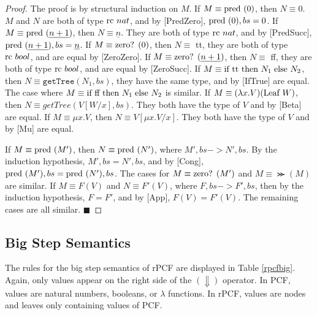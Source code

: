 \begin{proof}
The proof is by structural induction on $M$.  If $M\equiv \textrm{pred } (0)$, then $N \equiv 0$.  $M$ and $N$ are both of type $\textrm{rc } nat$, and by [PredZero], $\textrm{pred } (0), bs = 0$.  If $M\equiv \textrm{pred } ( \underline{n+1})$, then $N\equiv \underline{n}$.  They are both of type $\textrm{rc } nat$, and by [PredSucc], $\textrm{pred } (\underline{n+1}), bs = \underline{n}$.  If $M\equiv \textrm{zero? }(0)$, then $N\equiv$ tt, they are both of type $\textrm{rc } bool$, and are equal by [ZeroZero].  If $M\equiv \textrm{zero? }(\underline{n+1})$, then $N\equiv$ ff, they are both of type $\textrm{rc } bool$, and are equal by [ZeroSucc].  If $M\equiv \textrm{if } \textrm{tt } \textrm{then } N_1\; \textrm{else } N_2$, then $N\equiv \texttt{getTree}(N_1, bs)$, they have the same type, and by [IfTrue] are equal.  The case where $M \equiv \textrm{if } \textrm{ff } \textrm{then } N_1\; \textrm{else } N_2$ is similar.  If $M\equiv (\lambda x.V)(\textrm{Leaf } W)$, then $N\equiv getTree(V[W/x], bs)$.  They both have the type of $V$ and by [Beta] are equal.  If $M\equiv \mu x.V$, then $N\equiv V[\mu x.V/x]$.  They both have the type of $V$ and by [Mu] are equal.

If $M\equiv \textrm{pred }(M')$, then $N\equiv \textrm{pred }(N')$, where $M', bs->N', bs$.  By the induction hypothesis, $M', bs=N', bs$, and by [Cong], $\textrm{pred } (M'), bs=\textrm{pred }(N'), bs$.  The cases for $M\equiv \textrm{zero? }(M')$ and $M\equiv \Succ(M)$ are similar.  If $M\equiv F(V)$ and $N\equiv F'(V)$, where $F,bs->F',bs$, then by the induction hypothesis, $F=F'$, and by [App], $F(V)=F'(V)$.  The remaining cases are all similar.
\hfill $\blacksquare$
\end{proof}

\subsection{Big Step Semantics}

The rules for the big step semantics of rPCF are displayed in Table \ref{rpcfbig}.  Again, only values appear on the right side of the $(\Downarrow)$ operator.  In PCF, values are natural numbers, booleans, or $\lambda$ functions.  In rPCF, values are nodes and leaves only containing values of PCF.

